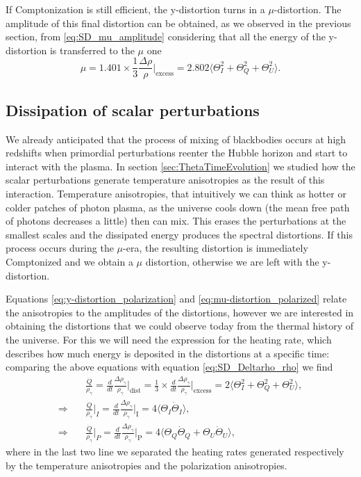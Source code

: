 If Comptonization is still efficient, the y-distortion turns in a $\mu$-distortion. The amplitude of this final distortion can be obtained, as we observed in the previous section, from \eqref{eq:SD_mu_amplitude} considering that all the energy of the y-distortion is transferred to the $\mu$ one
\begin{equation}
    \label{eq:mu-distortion_polarized}
    \mu=1.401\times\frac{1}{3}\frac{\Delta\rho}{\rho}\bigg|_\text{excess}=2.802\bigg\langle\Theta^2_I+\Theta^2_Q+\Theta^2_U\bigg\rangle.
\end{equation}



\subsection{Dissipation of scalar perturbations}
We already anticipated that the process of mixing of blackbodies occurs at high redshifts when primordial perturbations reenter the Hubble horizon and start to interact with the plasma. In section \ref{sec:ThetaTimeEvolution} we studied how the scalar perturbations generate temperature anisotropies as the result of this interaction. Temperature anisotropies, that intuitively we can think as hotter or colder patches of photon plasma, as the universe cools down (the mean free path of photons decreases a little) then can mix. This erases the perturbations at the smallest scales and the dissipated energy produces the spectral distortions. If this process occurs during the $\mu$-era, the resulting distortion is immediately Comptonized and we obtain a $\mu$ distortion, otherwise we are left with the y-distortion.

Equations \eqref{eq:y-distortion_polarization} and \eqref{eq:mu-distortion_polarized} relate the anisotropies to the amplitudes of the distortions, however we are interested in obtaining the distortions that we could observe today from the thermal history of the universe. For this we will need the expression for the heating rate, which describes how much energy is deposited in the distortions at a specific time: comparing the above equations with equation \eqref{eq:SD_Deltarho_rho} we find 
\begin{align}
    &\frac{\dot Q}{\rho_\gamma}=\frac{d}{dt}\frac{\Delta \rho_\gamma}{\rho_\gamma}\bigg|_\text{dist}=\frac{1}{3}\times\frac{d}{dt}\frac{\Delta \rho_\gamma}{\rho_\gamma}\bigg|_\text{excess}= 2\bigg\langle\Theta^2_I+\Theta^2_Q+\Theta^2_U\bigg\rangle,\nonumber\\
    \Rightarrow\quad&\frac{\dot Q}{\rho_\gamma}\bigg|_I=\frac{d}{dt}\frac{\Delta \rho_\gamma}{\rho_\gamma}\bigg|_\text{I}=4\langle\Theta_I\dot \Theta_I\rangle,\label{eq:heating_rate_I}\\
    \Rightarrow\quad&\frac{\dot Q}{\rho_\gamma}\bigg|_P=\frac{d}{dt}\frac{\Delta \rho_\gamma}{\rho_\gamma}\bigg|_\text{P}=4\langle\Theta_Q\dot \Theta_Q+\Theta_U\dot \Theta_U\rangle,\label{eq:heating_rate_P}
\end{align}
where in the last two line we separated the heating rates generated respectively by the temperature anisotropies and the polarization anisotropies.

